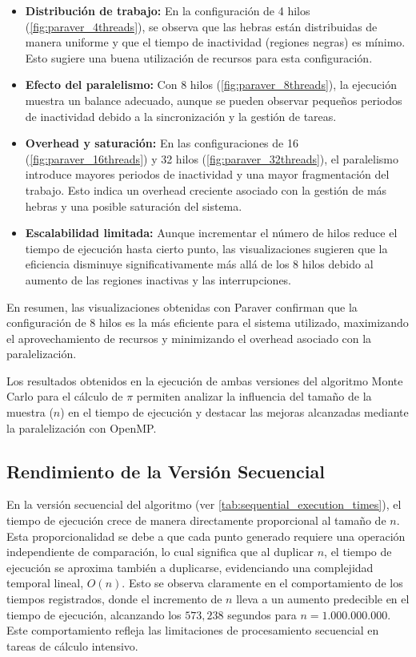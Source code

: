 \documentclass[a4paper, 10pt, onecolumn]{IEEEtran}
\begin{document}
\begin{itemize}
  \item \textbf{Distribución de trabajo:} En la configuración de 4 hilos (\cref{fig:paraver_4threads}), se observa que las hebras están distribuidas de manera uniforme y que el tiempo de inactividad (regiones negras) es mínimo. Esto sugiere una buena utilización de recursos para esta configuración.
  
  \item \textbf{Efecto del paralelismo:} Con 8 hilos (\cref{fig:paraver_8threads}), la ejecución muestra un balance adecuado, aunque se pueden observar pequeños periodos de inactividad debido a la sincronización y la gestión de tareas.
  
  \item \textbf{Overhead y saturación:} En las configuraciones de 16 (\cref{fig:paraver_16threads}) y 32 hilos (\cref{fig:paraver_32threads}), el paralelismo introduce mayores periodos de inactividad y una mayor fragmentación del trabajo. Esto indica un overhead creciente asociado con la gestión de más hebras y una posible saturación del sistema.
  
  \item \textbf{Escalabilidad limitada:} Aunque incrementar el número de hilos reduce el tiempo de ejecución hasta cierto punto, las visualizaciones sugieren que la eficiencia disminuye significativamente más allá de los 8 hilos debido al aumento de las regiones inactivas y las interrupciones.
\end{itemize}

En resumen, las visualizaciones obtenidas con Paraver confirman que la configuración de 8 hilos es la más eficiente para el sistema utilizado, maximizando el aprovechamiento de recursos y minimizando el overhead asociado con la paralelización.

Los resultados obtenidos en la ejecución de ambas versiones del algoritmo Monte Carlo para el cálculo de $\pi$ permiten analizar la influencia del tamaño de la muestra ($n$) en el tiempo de ejecución y destacar las mejoras alcanzadas mediante la paralelización con OpenMP.

\subsection{Rendimiento de la Versión Secuencial}

En la versión secuencial del algoritmo (ver \cref{tab:sequential_execution_times}), el tiempo de ejecución crece de manera directamente proporcional al tamaño de $n$. Esta proporcionalidad se debe a que cada punto generado requiere una operación independiente de comparación, lo cual significa que al duplicar $n$, el tiempo de ejecución se aproxima también a duplicarse, evidenciando una complejidad temporal lineal, $O(n)$. Esto se observa claramente en el comportamiento de los tiempos registrados, donde el incremento de $n$ lleva a un aumento predecible en el tiempo de ejecución, alcanzando los $573,238$ segundos para $n = 1.000.000.000$. Este comportamiento refleja las limitaciones de procesamiento secuencial en tareas de cálculo intensivo.
\end{document}

